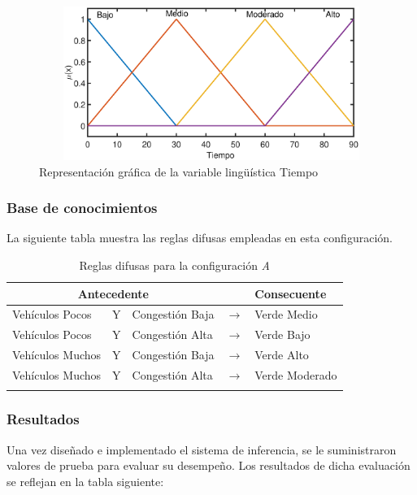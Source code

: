 \begin{figure}[H]
	\centering
	\includegraphics[height=5cm, width=12cm]{Variables/ConfigA_output1.eps}
	\caption[Gráfica variable lingüística tiempo - A]{Representación gráfica de la variable lingüística Tiempo}
\end{figure}

\subsubsection{Base de conocimientos}
La siguiente tabla muestra las reglas difusas empleadas en esta configuración.
\begin{longtable}[c]{lclcl} \toprule
	\multicolumn{3}{c}{Antecedente} & & Consecuente \\ \midrule
	Vehículos Pocos & Y & Congestión Baja& $\rightarrow$ & Verde Medio \\
	Vehículos Pocos & Y & Congestión Alta& $\rightarrow$ & Verde Bajo \\
	Vehículos Muchos &Y& Congestión Baja& $\rightarrow$ & Verde Alto \\
	Vehículos Muchos &Y& Congestión Alta& $\rightarrow$ & Verde Moderado \\ \hline
	\caption{Reglas difusas para la configuración \textit{A}}
\end{longtable}

\newpage
\subsubsection{Resultados}


Una vez diseñado e implementado el sistema de inferencia, se le suministraron valores de prueba para evaluar su desempeño. Los resultados de dicha evaluación se reflejan en la tabla siguiente:

